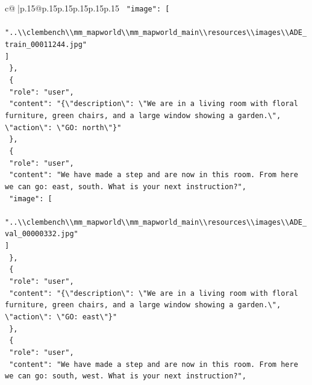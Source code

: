 \documentclass{article}
\begin{document}
{\begin{supertabular}{c@{$\;$}|p{.15\linewidth}@{}p{.15\linewidth}p{.15\linewidth}p{.15\linewidth}p{.15\linewidth}p{.15\linewidth}}
{{{\texttt{    "image": {[}} \\
\texttt{      "..\textbackslash{}\textbackslash{}clembench\textbackslash{}\textbackslash{}mm\_mapworld\textbackslash{}\textbackslash{}mm\_mapworld\_main\textbackslash{}\textbackslash{}resources\textbackslash{}\textbackslash{}images\textbackslash{}\textbackslash{}ADE\_train\_00011244.jpg"} \\
\texttt{    {]}} \\
\texttt{  \},} \\
\texttt{  \{} \\
\texttt{    "role": "user",} \\
\texttt{    "content": "\{\textbackslash{}"description\textbackslash{}": \textbackslash{}"We are in a living room with floral furniture, green chairs, and a large window showing a garden.\textbackslash{}", \textbackslash{}"action\textbackslash{}": \textbackslash{}"GO: north\textbackslash{}"\}"} \\
\texttt{  \},} \\
\texttt{  \{} \\
\texttt{    "role": "user",} \\
\texttt{    "content": "We have made a step and are now in this room. From here we can go: east, south. What is your next instruction?",} \\
\texttt{    "image": {[}} \\
\texttt{      "..\textbackslash{}\textbackslash{}clembench\textbackslash{}\textbackslash{}mm\_mapworld\textbackslash{}\textbackslash{}mm\_mapworld\_main\textbackslash{}\textbackslash{}resources\textbackslash{}\textbackslash{}images\textbackslash{}\textbackslash{}ADE\_val\_00000332.jpg"} \\
\texttt{    {]}} \\
\texttt{  \},} \\
\texttt{  \{} \\
\texttt{    "role": "user",} \\
\texttt{    "content": "\{\textbackslash{}"description\textbackslash{}": \textbackslash{}"We are in a living room with floral furniture, green chairs, and a large window showing a garden.\textbackslash{}", \textbackslash{}"action\textbackslash{}": \textbackslash{}"GO: east\textbackslash{}"\}"} \\
\texttt{  \},} \\
\texttt{  \{} \\
\texttt{    "role": "user",} \\
\texttt{    "content": "We have made a step and are now in this room. From here we can go: south, west. What is your next instruction?",} \\
}}}
\end{supertabular}}
\end{document}
